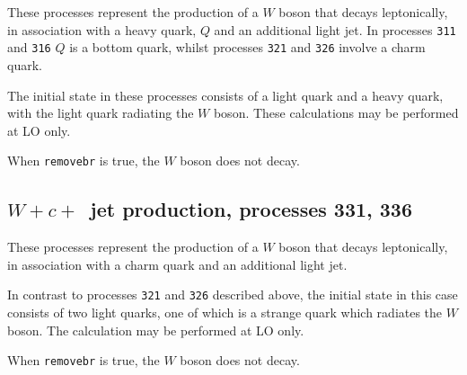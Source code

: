 \documentclass[12pt]{article}
\begin{document}
These processes represent the production of a $W$
boson that decays leptonically,
in association with a heavy quark, $Q$ and an additional light jet. In
processes {\tt 311} and {\tt 316} $Q$ is a bottom quark, whilst
processes {\tt 321} and {\tt 326} involve a charm quark.

The initial state in these processes consists of a light quark and a heavy 
quark, with the light quark radiating the $W$ boson. These calculations may
be performed at LO only.

When {\tt removebr} is true, the $W$ boson does not decay.

\subsection{$W+c+$~jet production, processes 331, 336}
\label{subsec:wcj}

These processes represent the production of a $W$
boson that decays leptonically,
in association with a charm quark and an additional light jet. 

In contrast to processes {\tt 321} and {\tt 326} described above, the initial
state in this case consists of two light quarks, one of which is a
strange quark which radiates the $W$ boson. The calculation may
be performed at LO only.

When {\tt removebr} is true, the $W$ boson does not decay.
\end{document}
